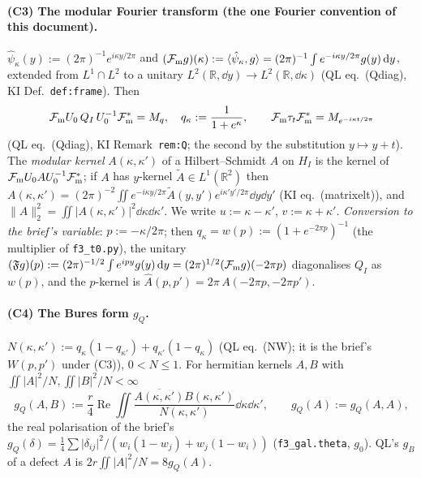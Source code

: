 \documentclass[11pt]{article}
\newcommand{\norm}[1]{\lVert#1\rVert}\newcommand{\abs}[1]{\lvert#1\rvert}\newcommand{\ip}[2]{\langle#1,#2\rangle}
\theoremstyle{definition}\newtheorem{hypothesis}[theorem]{Hypothesis}
\begin{document}
\paragraph{(C3) The modular Fourier transform (the one Fourier convention of this document).}
$\hat\psi_\kappa(y):=(2\pi)^{-1}e^{i\kappa y/2\pi}$ and $(\Ft g)(\kappa):=\ip{\hat\psi_\kappa}g
=(2\pi)^{-1}\int e^{-i\kappa y/2\pi}g(y)\dd y$, extended from $L^1\cap L^2$ to a unitary
$L^2(\mathbb R,\dd y)\to L^2(\mathbb R,\dd\kappa)$ (QL eq.~(Qdiag), KI Def.~\texttt{def:frame}).  Then
\begin{equation}\label{eq:Qdiag}
 \mathcal F_{\rm m} U_0\,Q_I\,U_0^{-1}\mathcal F_{\rm m}^*=M_{q},\quad q_\kappa:=\frac1{1+e^\kappa},\qquad
 \mathcal F_{\rm m}\tau_t\mathcal F_{\rm m}^*=M_{e^{-i\kappa t/2\pi}}
\end{equation}
(QL eq.~(Qdiag), KI Remark~\texttt{rem:Q}; the second by the substitution $y\mapsto y+t$).  The
\emph{modular kernel} $A(\kappa,\kappa')$ of a Hilbert--Schmidt $A$ on $H_I$ is the kernel of
$\mathcal F_{\rm m} U_0AU_0^{-1}\mathcal F_{\rm m}^*$; if $A$ has $y$-kernel $\widetilde A\in L^1(\mathbb R^2)$ then
$A(\kappa,\kappa')=(2\pi)^{-2}\iint e^{-i\kappa y/2\pi}\widetilde A(y,y')e^{i\kappa'y'/2\pi}\dd y\dd y'$
(KI eq.~(matrixelt)), and $\norm A_2^2=\iint\abs{A(\kappa,\kappa')}^2\dd\kappa\dd\kappa'$.  We write
$u:=\kappa-\kappa'$, $v:=\kappa+\kappa'$.  \emph{Conversion to the brief's variable}: $p:=-\kappa/2\pi$;
then $q_\kappa=w(p):=(1+e^{-2\pi p})^{-1}$ (the multiplier of \texttt{f3\_t0.py}), the unitary
$(\mathfrak Fg)(p):=(2\pi)^{-1/2}\int e^{ipy}g(y)\,\mathrm d y=(2\pi)^{1/2}(\mathcal F_{\rm m} g)(-2\pi p)$ diagonalises $Q_I$ as
$w(p)$, and the $p$-kernel is $\hat A(p,p')=2\pi\,A(-2\pi p,-2\pi p')$.

\paragraph{(C4) The Bures form $g_Q$.}
$N(\kappa,\kappa'):=q_\kappa(1-q_{\kappa'})+q_{\kappa'}(1-q_\kappa)$ (QL eq.~(NW); it is the brief's
$W(p,p')$ under (C3)), $0<N\le1$.  For hermitian kernels $A,B$ with $\iint\abs A^2/N,\iint\abs B^2/N<\infty$
\begin{equation}\label{eq:gQ}
 g_Q(A,B):=\frac r4\operatorname{Re}\iint\frac{\overline{A(\kappa,\kappa')}B(\kappa,\kappa')}
 {N(\kappa,\kappa')}\dd\kappa\dd\kappa',\qquad g_Q(A):=g_Q(A,A),
\end{equation}
the real polarisation of the brief's $g_Q(\delta)=\frac14\sum\abs{\delta_{ij}}^2/(w_i(1-w_j)+w_j(1-w_i))$
(\texttt{f3\_gal.theta}, $g_0$).  QL's $g_B$ of a defect $A$ is $2r\iint\abs A^2/N=8g_Q(A)$.
\end{document}
